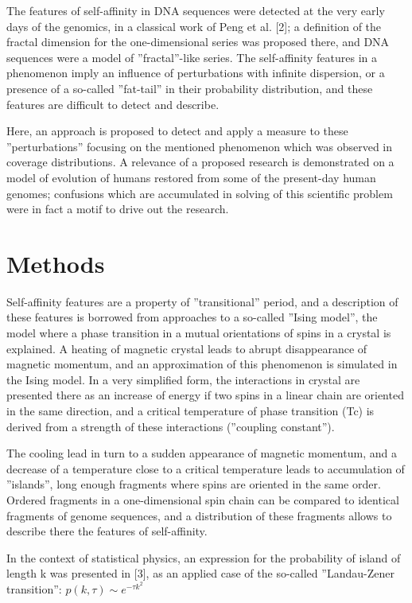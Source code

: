 \documentclass[a4paper]{article}
\begin{document}
The features of self-affinity in DNA sequences were detected at the very early days of the genomics, in a classical work of Peng et al. [2]; a definition of the fractal dimension for the one-dimensional series was proposed there, and DNA sequences were a model of ''fractal''-like series.
The self-affinity features in a phenomenon imply an influence of perturbations with infinite dispersion, or a presence of a so-called ''fat-tail'' in their probability distribution, and these features are difficult to detect and describe. 

Here, an approach is proposed to detect and apply a measure to these ''perturbations'' focusing on the mentioned phenomenon which was observed
in coverage distributions. A relevance of a proposed research is demonstrated on a model of evolution of humans restored from some of the present-day human genomes; confusions which are accumulated in solving of this scientific problem were in fact a motif to drive out the research.

\section{Methods}

Self-affinity features are a property of ''transitional'' period, and a description of these features is borrowed from approaches to a so-called ''Ising model'', the model
where a phase transition in a mutual orientations of spins in a crystal is explained. 
A heating of magnetic crystal leads to abrupt disappearance of magnetic momentum, and an approximation of this
phenomenon is simulated in the Ising model. In a very simplified form, the interactions in crystal are presented
there as an increase of energy if two spins in a linear chain are oriented in the same direction, and a critical
temperature of phase transition (Tc) is derived from a strength of these interactions (''coupling constant'').

The cooling lead in turn to a sudden appearance of magnetic momentum, and a decrease of a temperature
close to a critical temperature leads to accumulation of ''islands'', long enough fragments where
spins are oriented in the same order. Ordered fragments in a one-dimensional spin chain can be compared to identical fragments of genome sequences, and a distribution of these fragments allows to describe there the features of self-affinity. 

In the context of statistical physics, an expression for the probability of island of length k was presented in [3], as an applied case of the so-called ''Landau-Zener transition'': $p(k,\tau)  \sim e^{−\tau k^2}$
\end{document}
